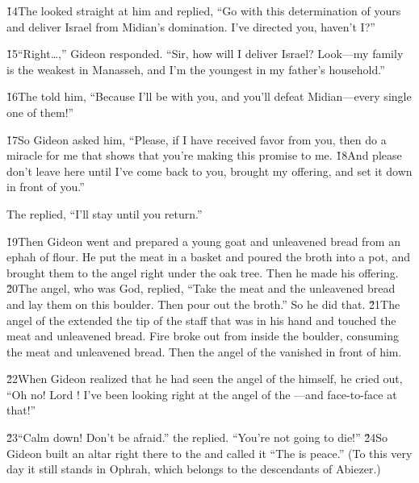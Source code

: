 \v{14}The  looked straight at him and replied, ``Go with this determination of yours and deliver Israel from Midian's domination. I've directed you, haven't I?''

\v{15}``Right{\ldots},'' Gideon responded. ``Sir, how will I deliver Israel? Look---my family is the weakest in Manasseh, and I'm the youngest in my father's household.''

\v{16}The  told him, ``Because I'll be with you, and you'll defeat Midian---every single one of them!''

\v{17}So Gideon asked him, ``Please, if I have received favor from you, then do a miracle for me that shows that you're making this promise to me. \v{18}And please don't leave here until I've come back to you, brought my offering, and set it down in front of you.''

The  replied, ``I'll stay until you return.''

\v{19}Then Gideon went and prepared a young goat and unleavened bread from an ephah of flour. He put the meat in a basket and poured the broth into a pot, and brought them to the angel right under the oak tree. Then he made his offering. \v{20}The angel, who was God, replied, ``Take the meat and the unleavened bread and lay them on this boulder. Then pour out the broth.'' So he did that. \v{21}The angel of the  extended the tip of the staff that was in his hand and touched the meat and unleavened bread. Fire broke out from inside the boulder, consuming the meat and unleavened bread. Then the angel of the  vanished in front of him.

\v{22}When Gideon realized that he had seen the angel of the  himself, he cried out, ``Oh no! Lord ! I've been looking right at the angel of the ---and face-to-face at that!''

\v{23}``Calm down! Don't be afraid.'' the  replied. ``You're not going to die!'' \v{24}So Gideon built an altar right there to the  and called it ``The  is peace.'' (To this very day it still stands in Ophrah, which belongs to the descendants of Abiezer.)

